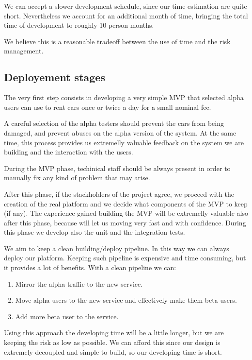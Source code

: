 \documentclass[11pt]{article} %
\begin{document}
We can accept a slower development schedule, since our time estimation are quite short. Nevertheless we account for an additional month of time, bringing the total time of development to roughly 10 person months.

We believe this is a reasonable tradeoff between the use of time and the risk management.

\subsection{Deployement stages}
The very first step consists in developing a very simple MVP that selected alpha users can use to rent cars once or twice a day for a small nominal fee. 

A careful selection of the alpha testers should prevent the cars from being damaged, and prevent abuses on the alpha version of the system. At the same time, this process provides us extremelly valuable feedback on the system we are building and the interaction with the users.

During the MVP phase, techinical staff should be always present in order to manually fix any kind of problem that may arise.

After this phase, if the stackholders of the project agree, we proceed with the creation of the real platform and we decide what components of the MVP to keep (if any). The experience gained building the MVP will be extremelly valuable also after this phase, because will let us moving very fast and with confidence. During this phase we develop also the unit and the integration tests.

We aim to keep a clean building/deploy pipeline. In this way we can always deploy our platform. Keeping such pipeline is expensive and time consuming, but it provides a lot of benefits. With a clean pipeline we can:

\begin{enumerate}[noitemsep]
	\item Mirror the alpha traffic to the new service.
	\item Move alpha users to the new service and effectively make them beta users.
	\item Add more beta user to the service.
\end{enumerate}

Using this approach the developing time will be a little longer, but we are keeping the risk as low as possible. We can afford this since our design is extremely decoupled and simple to build, so our developing time is short.
\end{document}
